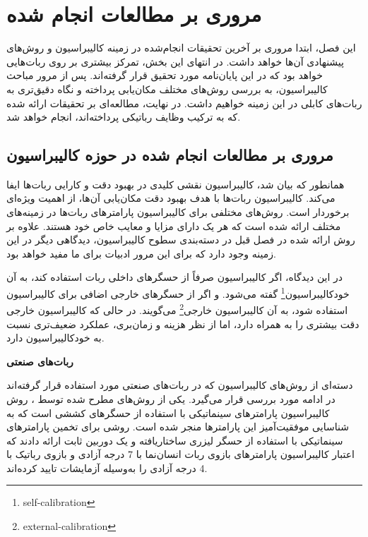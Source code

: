 \chapter{مروری بر مطالعات انجام شده}
این فصل، ابتدا مروری بر آخرین تحقیقات انجام‌شده در زمینه کالیبراسیون و روش‌های پیشنهادی آن‌ها خواهد داشت. در انتهای این بخش، تمرکز بیشتری بر روی ربات‌هایی خواهد بود که در این پایان‌نامه مورد تحقیق قرار گرفته‌اند. پس از مرور مباحث کالیبراسیون، به بررسی روش‌های مختلف مکان‌یابی پرداخته و نگاه دقیق‌تری به ربات‌های کابلی در این زمینه خواهیم داشت. در نهایت، مطالعه‌ای بر تحقیقات ارائه شده که به ترکیب وظایف رباتیکی پرداخته‌اند، انجام خواهد شد.

\section{مروری بر مطالعات انجام شده در حوزه کالیبراسیون} 



همانطور که بیان شد، کالیبراسیون نقشی کلیدی در بهبود دقت و کارایی ربات‌ها ایفا می‌کند. کالیبراسیون ربات‌ها با هدف بهبود دقت مکان‌یابی آن‌ها، از اهمیت ویژه‌ای برخوردار است. روش‌های مختلفی برای کالیبراسیون پارامترهای ربات‌ها در زمینه‌های مختلف ارائه شده است که هر یک دارای مزایا و معایب خاص خود هستند. علاوه بر روش ارائه شده در فصل قبل در دسته‌بندی سطوح کالیبراسیون، دیدگاهی دیگر در این زمینه وجود دارد که برای این مرور ادبیات برای ما مفید خواهد بود.

در این دیدگاه، اگر کالیبراسیون صرفاً از حسگرهای داخلی ربات استفاده کند، به آن خودکالیبراسیون\footnote{self-calibration} گفته می‌شود. و اگر از حسگر‌های خارجی اضافی برای کالیبراسیون استفاده شود، به آن کالیبراسیون خارجی\footnote{external-calibration} می‌گویند. در حالی که کالیبراسیون خارجی دقت بیشتری را به همراه دارد، اما از نظر هزینه و زمان‌بری، عملکرد ضعیف‌تری نسبت به خودکالیبراسیون دارد.



\textbf{ربات‌های صنعتی}

 دسته‌ای از روش‌های کالیبراسیون که در ربات‌های صنعتی مورد استفاده قرار گرفته‌اند در ادامه مورد بررسی قرار می‌گیرد. یکی از روش‌های مطرح شده توسط \cite{gan2019calibration}، روش کالیبراسیون پارامترهای سینماتیکی با استفاده از حسگرهای کششی است که به شناسایی موفقیت‌آمیز این پارامترها منجر شده است. \cite{park2011laser} روشی برای تخمین پارامترهای سینماتیکی با استفاده از حسگر لیزری ساختاریافته و یک دوربین ثابت ارائه دادند که اعتبار کالیبراسیون پارامترهای بازوی ربات انسان‌نما با 7 درجه آزادی و بازوی رباتیک با 4 درجه آزادی را به‌وسیله آزمایشات تایید کرده‌اند. 
 
